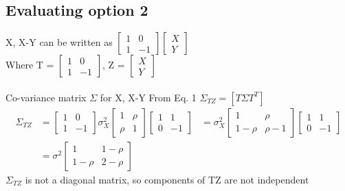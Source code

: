 \documentclass{article}
\begin{document}
\subsection{Evaluating option 2}
X, X-Y can be written as
$\begin{bmatrix}
   1   &   0\\
   1   &   -1
\end{bmatrix}
\begin{bmatrix}
   X \\
   Y
\end{bmatrix}$\\
Where T = $\begin{bmatrix}
   1   &   0\\
   1   &   -1
\end{bmatrix}$, Z = $\begin{bmatrix}
   X \\
   Y
\end{bmatrix}$\\
\\
Co-variance matrix $\Sigma$ for X, X-Y
From Eq. 1 $\Sigma_{TZ} = [T\Sigma T^T]$
\begin{align*}
    \Sigma_{TZ} &= \begin{bmatrix}
   1   &   0\\
   1   &   -1
\end{bmatrix} \sigma_X^2 
\begin{bmatrix}
   1    & \rho \\
   \rho &  1 
\end{bmatrix}
\begin{bmatrix}
   1   &   1\\
   0   &   -1
\end{bmatrix}
&= \sigma_X^2 \begin{bmatrix}
    1         &   \rho\\
    1 - \rho  &    \rho - 1
\end{bmatrix}
\begin{bmatrix}
    1     &   1\\
    0     & - 1
\end{bmatrix}\\
& = \sigma^2 \begin{bmatrix}
   1         &    1 - \rho\\
   1 - \rho  &    2 - \rho
\end{bmatrix}
\end{align*}
$\Sigma_{TZ}$ is not a diagonal matrix, so components of TZ are not independent
\end{document}
